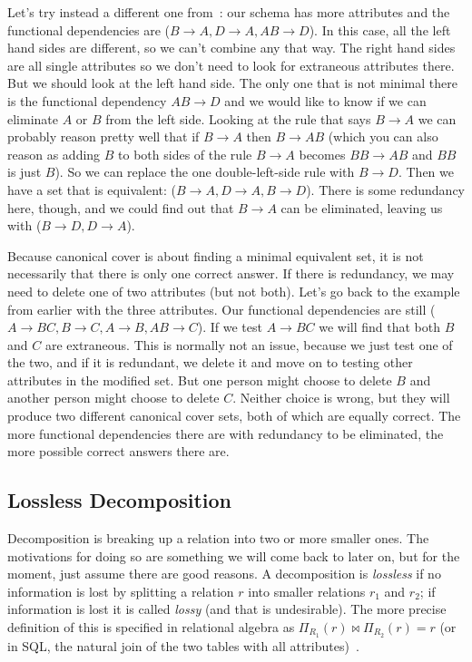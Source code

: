 \documentclass[a4paper]{report}
\begin{document}
Let's try instead a different one from~\cite{fds}: our schema has more attributes and the functional dependencies are ($B \rightarrow A, D \rightarrow A, AB \rightarrow D$). In this case, all the left hand sides are different, so we can't combine any that way. The right hand sides are all single attributes so we don't need to look for extraneous attributes there. But we should look at the left hand side. The only one that is not minimal there is the functional dependency $AB \rightarrow D$ and we would like to know if we can eliminate $A$ or $B$ from the left side. Looking at the rule that says $B \rightarrow A$ we can probably reason pretty well that if $B \rightarrow A$ then $B \rightarrow AB$  (which you can also reason as adding $B$ to both sides of the rule $B \rightarrow A$ becomes $BB \rightarrow AB$ and $BB$ is just $B$). So we can replace the one double-left-side rule with $B \rightarrow D$. Then we have a set that is equivalent: ($B \rightarrow A, D \rightarrow A, B \rightarrow D$). There is some redundancy here, though, and we could find out that $B \rightarrow A$ can be eliminated, leaving us with ($B \rightarrow D, D \rightarrow A$).

Because canonical cover is about finding a minimal equivalent set, it is not necessarily that there is only one correct answer. If there is redundancy, we may need to delete one of two attributes (but not both). Let's go back to the example from earlier with the three attributes. Our functional dependencies are still ($A \rightarrow BC, B \rightarrow C, A \rightarrow B, AB \rightarrow C$). If we test $A \rightarrow BC$ we will find that both $B$ and $C$ are extraneous. This is normally not an issue, because we just test one of the two, and if it is redundant, we delete it and move on to testing other attributes in the modified set. But one person might choose to delete $B$ and another person might choose to delete $C$. Neither choice is wrong, but they will produce two different canonical cover sets, both of which are equally correct. The more functional dependencies there are with redundancy to be eliminated, the more possible correct answers there are. 


\subsection*{Lossless Decomposition}

Decomposition is breaking up a relation into two or more smaller ones. The motivations for doing so are something we will come back to later on, but for the moment, just assume there are good reasons. A decomposition is \textit{lossless} if no information is lost by splitting a relation $r$ into smaller relations $r_{1}$ and $r_{2}$; if information is lost it is called \textit{lossy} (and that is undesirable). The more precise definition of this is specified in relational algebra as $\Pi_{R_{1}}(r) \bowtie \Pi_{R_{2}}(r) = r$ (or in SQL, the natural join of the two tables with all attributes)~\cite{dsc}. 
\end{document}
